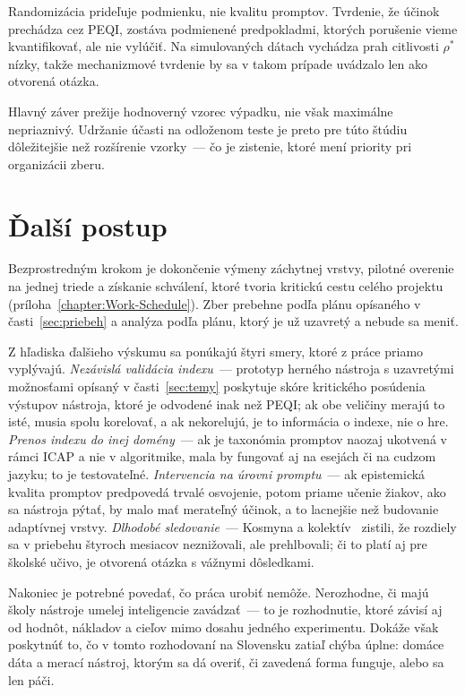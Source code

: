 \begin{description}[leftmargin=0.6cm, nosep]
    \item[\textbf{Mechanizmus nie je identifikovaný dizajnom.}] Randomizácia prideľuje podmienku, nie kvalitu promptov. Tvrdenie, že účinok prechádza cez PEQI, zostáva podmienené predpokladmi, ktorých porušenie vieme kvantifikovať, ale nie vylúčiť. Na simulovaných dátach vychádza prah citlivosti $\rho^\ast$ nízky, takže mechanizmové tvrdenie by sa v takom prípade uvádzalo len ako otvorená otázka.
    \item[\textbf{Citlivosť na výpadok.}] Hlavný záver prežije hodnoverný vzorec výpadku, nie však maximálne nepriaznivý. Udržanie účasti na odloženom teste je preto pre túto štúdiu dôležitejšie než rozšírenie vzorky~--- čo je zistenie, ktoré mení priority pri organizácii zberu.
\end{description}

\section{Ďalší postup}

Bezprostredným krokom je dokončenie výmeny záchytnej vrstvy, pilotné overenie na jednej triede a získanie schválení, ktoré tvoria kritickú cestu celého projektu (príloha~\ref{chapter:Work-Schedule}). Zber prebehne podľa plánu opísaného v časti~\ref{sec:priebeh} a analýza podľa plánu, ktorý je už uzavretý a nebude sa meniť.

Z hľadiska ďalšieho výskumu sa ponúkajú štyri smery, ktoré z práce priamo vyplývajú. \emph{Nezávislá validácia indexu}~--- prototyp herného nástroja s uzavretými možnosťami opísaný v časti~\ref{sec:temy} poskytuje skóre kritického posúdenia výstupov nástroja, ktoré je odvodené inak než PEQI; ak obe veličiny merajú to isté, musia spolu korelovať, a ak nekorelujú, je to informácia o indexe, nie o hre. \emph{Prenos indexu do inej domény}~--- ak je taxonómia promptov naozaj ukotvená v rámci ICAP a nie v algoritmike, mala by fungovať aj na esejách či na cudzom jazyku; to je testovateľné. \emph{Intervencia na úrovni promptu}~--- ak epistemická kvalita promptov predpovedá trvalé osvojenie, potom priame učenie žiakov, ako sa nástroja pýtať, by malo mať merateľný účinok, a to lacnejšie než budovanie adaptívnej vrstvy. \emph{Dlhodobé sledovanie}~--- Kosmyna a kolektív~\cite{kosmyna2025brain} zistili, že rozdiely sa v priebehu štyroch mesiacov neznižovali, ale prehlbovali; či to platí aj pre školské učivo, je otvorená otázka s vážnymi dôsledkami.

Nakoniec je potrebné povedať, čo práca urobiť nemôže. Nerozhodne, či majú školy nástroje umelej inteligencie zavádzať~--- to je rozhodnutie, ktoré závisí aj od hodnôt, nákladov a cieľov mimo dosahu jedného experimentu. Dokáže však poskytnúť to, čo v tomto rozhodovaní na Slovensku zatiaľ chýba úplne: domáce dáta a merací nástroj, ktorým sa dá overiť, či zavedená forma funguje, alebo sa len páči.

